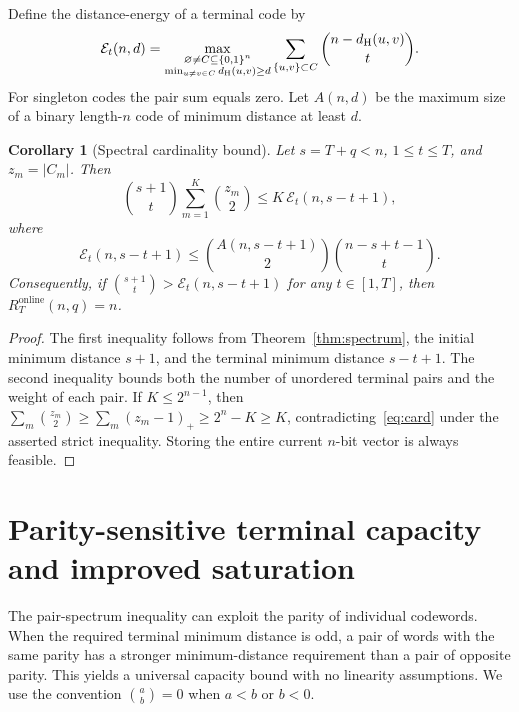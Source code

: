 \documentclass[11pt,a4paper]{article}
\newtheorem{corollary}[theorem]{Corollary}
\newcommand{\dist}{d_{\rm H}}
\begin{document}
Define the distance-energy of a terminal code by
\[
\mathcal E_t(n,d)=\max_{\substack{\varnothing\ne C\subseteq\{0,1\}^n\\ \min_{u\ne v\in C}\dist(u,v)\ge d}}
\sum_{\{u,v\}\subset C}\binom{n-\dist(u,v)}{t}.
\]
For singleton codes the pair sum equals zero. Let $A(n,d)$ be the maximum size of a binary length-$n$ code of minimum distance at least $d$.
\begin{corollary}[Spectral cardinality bound]\label{cor:capacity}
Let $s=T+q<n$, $1\le t\le T$, and $z_m=|C_m|$. Then
\begin{equation}\label{eq:card}
\binom{s+1}{t}\sum_{m=1}^K\binom{z_m}{2}
\le K\,\mathcal E_t(n,s-t+1),
\end{equation}
where
\begin{equation}\label{eq:coarse}
\mathcal E_t(n,s-t+1)\le
\binom{A(n,s-t+1)}{2}\binom{n-s+t-1}{t}.
\end{equation}
Consequently, if $\binom{s+1}{t}>\mathcal E_t(n,s-t+1)$ for any $t\in[1,T]$, then $R_T^{\mathrm{online}}(n,q)=n$.
\end{corollary}
\begin{proof}
The first inequality follows from Theorem~\ref{thm:spectrum}, the initial minimum distance $s+1$, and the terminal minimum distance $s-t+1$. The second inequality bounds both the number of unordered terminal pairs and the weight of each pair. If $K\le2^{n-1}$, then $\sum_m\binom{z_m}{2}\ge\sum_m(z_m-1)_+\ge 2^n-K\ge K$, contradicting~\eqref{eq:card} under the asserted strict inequality. Storing the entire current $n$-bit vector is always feasible.
\end{proof}

\section{Parity-sensitive terminal capacity and improved saturation}\label{sec:parity}
The pair-spectrum inequality can exploit the parity of individual codewords. When the required terminal minimum distance is odd, a pair of words with the same parity has a stronger minimum-distance requirement than a pair of opposite parity. This yields a universal capacity bound with no linearity assumptions. We use the convention $\binom ab=0$ when $a<b$ or $b<0$.
\end{document}
